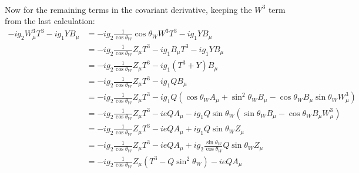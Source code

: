 \documentclass[12pt,a4]{article}
\begin{document}
\begin{enumerate}
\begin{enumerate}
\begin{align*}
        \end{align*}
        Now for the remaining terms in the covariant derivative, keeping the $W^3$ term from the last calculation:
        \begin{align*}
          - ig_2  W^3_\mu T^3 - i g_1 Y B_\mu &= -ig_2 \frac{1}{\cos \theta_W }\cos \theta_W W^3T^3 - ig_1 Y B_\mu\\
                                              &= -ig_2 \frac{1}{\cos \theta_W }Z_\mu T^3 - i g_1 B_\mu T^3- ig_1 Y B_\mu\\
                                              &= -ig_2 \frac{1}{\cos \theta_W }Z_\mu T^3 - i g_1 ( T^3 + Y ) B_\mu\\
                                              &= -ig_2 \frac{1}{\cos \theta_W }Z_\mu T^3 - i g_1 Q B_\mu\\
                                              &= -ig_2 \frac{1}{\cos \theta_W }Z_\mu T^3 - i g_1 Q (\cos \theta_W A_\mu + \sin^2 \theta_W B_\mu - \cos \theta_W B_\mu \sin \theta_W W^3_\mu)\\
                                              &= -ig_2 \frac{1}{\cos \theta_W }Z_\mu T^3 - i e Q A_\mu - i g_1 Q \sin \theta_W (\sin \theta_W B_\mu - \cos \theta_W B_\mu  W^3_\mu)\\
                                              &= -ig_2 \frac{1}{\cos \theta_W }Z_\mu T^3 - i e Q A_\mu + i g_1 Q \sin \theta_W Z_\mu\\
                                              &= -ig_2 \frac{1}{\cos \theta_W }Z_\mu T^3 - i e Q A_\mu + i g_2 \frac{\sin \theta_W}{\cos \theta_W} Q \sin \theta_W Z_\mu\\
                                              &= -ig_2 \frac{1}{\cos \theta_W }Z_\mu (T^3 - Q \sin^2 \theta_W) - i e Q A_\mu

\end{align*}
\end{enumerate}
\end{enumerate}
\end{document}
